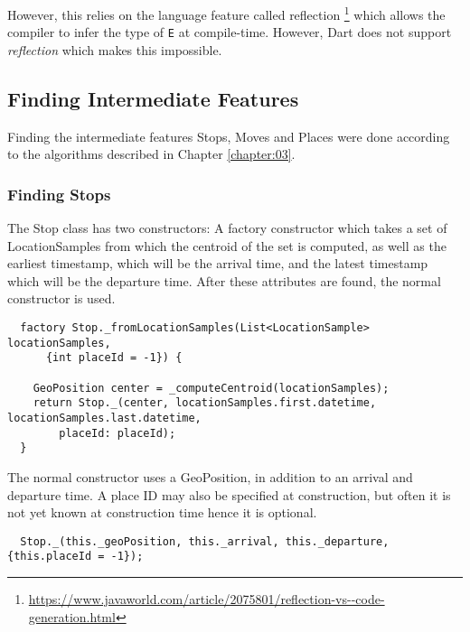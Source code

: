 However, this relies on the language feature called reflection \footnote{\url{https://www.javaworld.com/article/2075801/reflection-vs--code-generation.html}} which allows the compiler to infer the type of \verb|E| at compile-time. However, Dart does not support \textit{reflection} which makes this impossible.

\subsection{Finding Intermediate Features}
Finding the intermediate features Stops, Moves and Places were done according to the algorithms described in Chapter \ref{chapter:03}. 

\subsubsection{Finding Stops}
The Stop class has two constructors: A factory constructor which takes a set of LocationSamples from which the centroid of the set is computed, as well as the earliest timestamp, which will be the arrival time, and the latest timestamp which will be the departure time. After these attributes are found, the normal constructor is used.

\begin{verbatim}
  factory Stop._fromLocationSamples(List<LocationSample> locationSamples,
      {int placeId = -1}) {
      
    GeoPosition center = _computeCentroid(locationSamples);
    return Stop._(center, locationSamples.first.datetime, locationSamples.last.datetime,
        placeId: placeId);
  }
\end{verbatim}

The normal constructor uses a GeoPosition, in addition to an arrival and departure time. A place ID may also be specified at construction, but often it is not yet known at construction time hence it is optional.

\begin{verbatim}
  Stop._(this._geoPosition, this._arrival, this._departure, {this.placeId = -1});
\end{verbatim}

